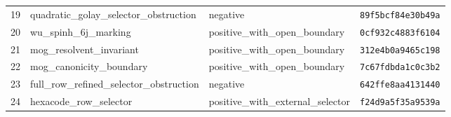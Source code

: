 \begin{longtable}{rlll}
19 & quadratic\_golay\_selector\_obstruction & negative & \texttt{89f5bcf84e30b49a} \\
20 & wu\_spinh\_6j\_marking & positive\_with\_open\_boundary & \texttt{0cf932c4883f6104} \\
21 & mog\_resolvent\_invariant & positive\_with\_open\_boundary & \texttt{312e4b0a9465c198} \\
22 & mog\_canonicity\_boundary & positive\_with\_open\_boundary & \texttt{7c67fdbda1c0c3b2} \\
23 & full\_row\_refined\_selector\_obstruction & negative & \texttt{642ffe8aa4131440} \\
24 & hexacode\_row\_selector & positive\_with\_external\_selector & \texttt{f24d9a5f35a9539a} \\
\bottomrule
\end{longtable}
